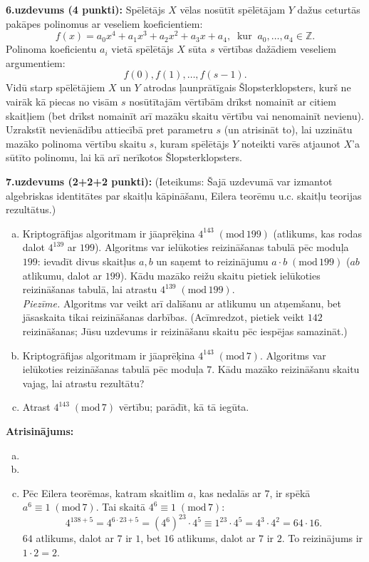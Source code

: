 \documentclass[11pt]{article}
\begin{document}
{\footnotesize
\vspace{6pt}
{\bf 6.uzdevums (4 punkti):}
Spēlētājs $X$ vēlas nosūtīt spēlētājam $Y$ dažus ceturtās pakāpes polinomus ar veseliem koeficientiem: 
$$f(x) = a_0x^4 + a_1x^3 + a_2x^2 + a_3x + a_4,\;\;\text{kur}\;\;a_0,\ldots,a_4 \in \mathbb{Z}.$$
Polinoma koeficientu $a_i$ vietā spēlētājs $X$ sūta $s$ vērtības dažādiem veseliem argumentiem: 
$$f(0),f(1),\ldots,f(s-1).$$
Vidū starp spēlētājiem $X$ un $Y$ atrodas ļaunprātīgais Šlopsterklopsters, kurš ne vairāk kā piecas
no visām $s$ nosūtītajām vērtībām drīkst nomainīt ar citiem skaitļiem (bet drīkst nomainīt arī mazāku skaitu 
vērtību vai nenomainīt nevienu).\\
Uzrakstīt nevienādību attiecībā pret parametru $s$ (un atrisināt to), lai uzzinātu mazāko polinoma vērtību skaitu $s$, kuram
spēlētājs $Y$ noteikti varēs atjaunot $X$'a sūtīto polinomu, lai kā arī nerīkotos Šlopsterklopsters.
}


{\footnotesize
\vspace{6pt}
{\bf 7.uzdevums (2+2+2 punkti):} 
(Ieteikums: Šajā uzdevumā var izmantot algebriskas identitātes par skaitļu kāpināšanu, Eilera teorēmu u.c. skaitļu teorijas rezultātus.)
\begin{enumerate}[(a)]
\item Kriptogrāfijas algoritmam ir jāaprēķina $4^{143}\;(\text{mod}\,199)$ (atlikums, kas rodas dalot $4^{139}$ ar $199$). 
Algoritms var ielūkoties reizināšanas tabulā pēc moduļa $199$: ievadīt divus skaitļus $a,b$ un saņemt to reizinājumu 
$a\cdot{}b\;(\text{mod}\,199)$ ($ab$ atlikumu, dalot ar $199$).
Kādu mazāko reižu skaitu pietiek ielūkoties reizināšanas tabulā, lai atrastu $4^{139}\;(\text{mod}\,199)$.\\
{\em Piezīme.} Algoritms var veikt arī dalīšanu ar atlikumu un atņemšanu, bet jāsaskaita tikai reizināšanas darbības.
(Acīmredzot, pietiek veikt $142$ reizināšanas; Jūsu uzdevums ir reizināšanu skaitu pēc iespējas samazināt.)
\item Kriptogrāfijas algoritmam ir jāaprēķina $4^{143}\;(\text{mod}\,7)$. Algoritms var ielūkoties reizināšanas tabulā 
pēc moduļa $7$. Kādu mazāko reizināšanu skaitu vajag, lai atrastu rezultātu? 
\item Atrast $4^{143}\;(\text{mod}\,7)$ vērtību; parādīt, kā tā iegūta.
\end{enumerate}
}


\vspace{6pt}
{\bf Atrisinājums:}
\begin{enumerate}[(a)]
\item 
\item
\item Pēc Eilera teorēmas, katram skaitlim $a$, kas nedalās ar $7$, ir spēkā $a^{6} \equiv 1\;(\text{mod}\,7)$. 
Tai skaitā $4^6 \equiv 1\;(\text{mod}\,7)$:
\[ 4^{138+5} = 4^{6\cdot{}23+5} = (4^6)^{23} \cdot{} 4^5 \equiv 1^{23} \cdot{} 4^5 = 4^3 \cdot 4^2 = 64 \cdot 16. \]
$64$ atlikums, dalot ar $7$ ir $1$, bet $16$ atlikums, dalot ar $7$ ir $2$. To reizinājums ir $1 \cdot 2 = 2$. 
\end{enumerate}
\end{document}
